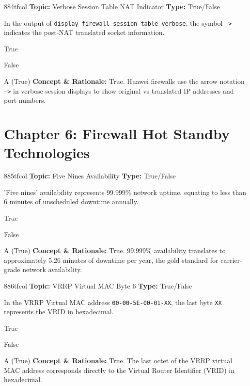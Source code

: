 \begin{qcard}{884}{tfcol}
\textcolor{darkslate!75}{\small\textbf{Topic:} Verbose Session Table NAT Indicator \hfill \textbf{Type:} True/False}\vspace{0.4em}\par
In the output of \texttt{display firewall session table verbose}, the symbol \texttt{--\textgreater{}} indicates the post-NAT translated socket information.
\begin{qoptions}
\item True
\item False
\end{qoptions}
\end{qcard}
\nopagebreak
\begin{explainbox}{A (True)}
\textbf{Concept \& Rationale:} True. Huawei firewalls use the arrow notation \texttt{--\textgreater{}} in verbose session displays to show original vs translated IP addresses and port numbers.
\end{explainbox}

\section{Chapter 6: Firewall Hot Standby Technologies}

\begin{qcard}{885}{tfcol}
\textcolor{darkslate!75}{\small\textbf{Topic:} Five Nines Availability \hfill \textbf{Type:} True/False}\vspace{0.4em}\par
'Five nines' availability represents 99.999\% network uptime, equating to less than 6 minutes of unscheduled downtime annually.
\begin{qoptions}
\item True
\item False
\end{qoptions}
\end{qcard}
\nopagebreak
\begin{explainbox}{A (True)}
\textbf{Concept \& Rationale:} True. 99.999\% availability translates to approximately 5.26 minutes of downtime per year, the gold standard for carrier-grade network availability.
\end{explainbox}

\begin{qcard}{886}{tfcol}
\textcolor{darkslate!75}{\small\textbf{Topic:} VRRP Virtual MAC Byte 6 \hfill \textbf{Type:} True/False}\vspace{0.4em}\par
In the VRRP Virtual MAC address \texttt{00-00-5E-00-01-XX}, the last byte \texttt{XX} represents the VRID in hexadecimal.
\begin{qoptions}
\item True
\item False
\end{qoptions}
\end{qcard}
\nopagebreak
\begin{explainbox}{A (True)}
\textbf{Concept \& Rationale:} True. The last octet of the VRRP virtual MAC address corresponds directly to the Virtual Router Identifier (VRID) in hexadecimal.
\end{explainbox}

